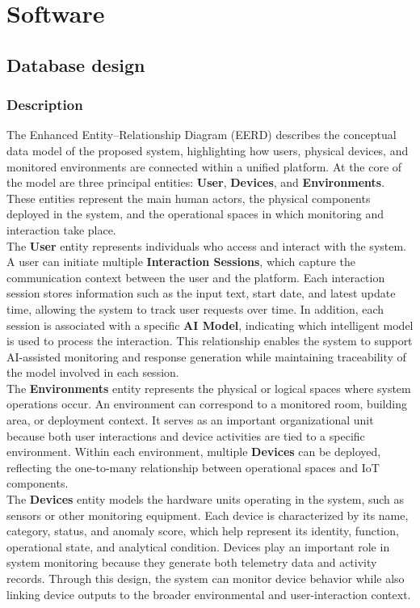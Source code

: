\clearpage
\section{Software}
\subsection{Database design}

\subsubsection{Description}
The Enhanced Entity--Relationship Diagram (EERD) describes the conceptual data model of the proposed system, highlighting how users, physical devices, and monitored environments are connected within a unified platform. At the core of the model are three principal entities: \textbf{User}, \textbf{Devices}, and \textbf{Environments}. These entities represent the main human actors, the physical components deployed in the system, and the operational spaces in which monitoring and interaction take place. \\

The \textbf{User} entity represents individuals who access and interact with the system. A user can initiate multiple \textbf{Interaction Sessions}, which capture the communication context between the user and the platform. Each interaction session stores information such as the input text, start date, and latest update time, allowing the system to track user requests over time. In addition, each session is associated with a specific \textbf{AI Model}, indicating which intelligent model is used to process the interaction. This relationship enables the system to support AI-assisted monitoring and response generation while maintaining traceability of the model involved in each session. \\

The \textbf{Environments} entity represents the physical or logical spaces where system operations occur. An environment can correspond to a monitored room, building area, or deployment context. It serves as an important organizational unit because both user interactions and device activities are tied to a specific environment. Within each environment, multiple \textbf{Devices} can be deployed, reflecting the one-to-many relationship between operational spaces and IoT components. \\

The \textbf{Devices} entity models the hardware units operating in the system, such as sensors or other monitoring equipment. Each device is characterized by its name, category, status, and anomaly score, which help represent its identity, function, operational state, and analytical condition. Devices play an important role in system monitoring because they generate both telemetry data and activity records. Through this design, the system can monitor device behavior while also linking device outputs to the broader environmental and user-interaction context. \\


